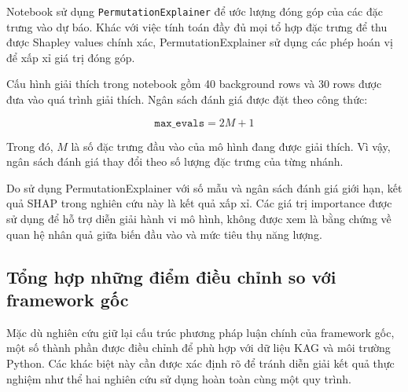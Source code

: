 Notebook sử dụng \texttt{PermutationExplainer} để ước lượng
đóng góp của các đặc trưng vào dự báo. Khác với việc tính toán
đầy đủ mọi tổ hợp đặc trưng để thu được Shapley values chính
xác, PermutationExplainer sử dụng các phép hoán vị để xấp xỉ
giá trị đóng góp.

Cấu hình giải thích trong notebook gồm 40 background rows
và 30 rows được đưa vào quá trình giải thích. Ngân sách đánh
giá được đặt theo công thức:

\begin{equation}
    \texttt{max\_evals}=2M+1
    \label{eq:shap-max-evals}
\end{equation}

Trong đó, $M$ là số đặc trưng đầu vào của mô hình đang được
giải thích. Vì vậy, ngân sách đánh giá thay đổi theo số lượng
đặc trưng của từng nhánh.

Do sử dụng PermutationExplainer với số mẫu và ngân sách đánh
giá giới hạn, kết quả SHAP trong nghiên cứu này là kết quả
xấp xỉ. Các giá trị importance được sử dụng để hỗ trợ diễn
giải hành vi mô hình, không được xem là bằng chứng về quan
hệ nhân quả giữa biến đầu vào và mức tiêu thụ năng lượng.

\subsection{Tổng hợp những điểm điều chỉnh so với framework gốc}
\label{subsec:framework-deviations}

Mặc dù nghiên cứu giữ lại cấu trúc phương pháp luận chính
của framework gốc, một số thành phần được điều chỉnh để phù
hợp với dữ liệu KAG và môi trường Python. Các khác biệt này
cần được xác định rõ để tránh diễn giải kết quả thực nghiệm
như thể hai nghiên cứu sử dụng hoàn toàn cùng một quy trình.

